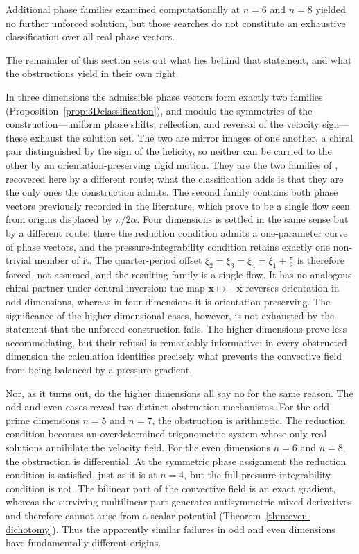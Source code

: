 \documentclass[11pt]{jfm}
\numberwithin{equation}{section}
\begin{document}
\noindent Additional phase families examined computationally at $n=6$ and $n=8$ yielded no further
unforced solution, but those searches do not constitute an exhaustive classification over all real
phase vectors.

\noindent The remainder of this section sets out what lies behind that statement, and what the
obstructions yield in their own right.

In three dimensions the admissible phase vectors form exactly
two families (Proposition~\ref{prop:3Dclassification}), and modulo the symmetries of the
construction---uniform phase shifts, reflection, and reversal of the velocity sign---these exhaust
the solution set. The two are mirror images of one another, a chiral pair distinguished by the sign
of the helicity, so neither can be carried to the other by an orientation-preserving rigid motion. They are the two
families of \citet{ant}, recovered here by a different route; what the classification adds is that
they are the only ones the construction admits. The second family contains both phase vectors
previously recorded in the literature, which prove to be a single flow seen from origins displaced
by $\pi/2\alpha$. Four dimensions is settled in the same sense but by
a different route: there the reduction condition admits a one-parameter curve of phase vectors,
and the pressure-integrability condition retains exactly one non-trivial member of it. The
quarter-period offset $\xi_2=\xi_3=\xi_4=\xi_1+\tfrac{\pi}{2}$ is therefore forced, not assumed,
and the resulting family is a single flow. It has no analogous chiral partner under central inversion: the map
$\boldsymbol{x}\mapsto-\boldsymbol{x}$ reverses
orientation in odd dimensions, whereas in four dimensions it is orientation-preserving. The significance of the
higher-dimensional cases, however, is not exhausted by the statement that the unforced
construction fails. The higher dimensions prove less accommodating, but their refusal is
remarkably informative: in every obstructed dimension the calculation identifies precisely
what prevents the convective field from being balanced by a pressure gradient.

Nor, as it turns out, do the higher dimensions all say no for the same reason. The odd and
even cases reveal two distinct obstruction mechanisms. For the odd prime dimensions $n=5$
and $n=7$, the obstruction is arithmetic. The reduction condition becomes an overdetermined
trigonometric system whose only real solutions annihilate the velocity field. For the even dimensions $n=6$ and $n=8$, the obstruction is
differential. At the symmetric phase assignment the reduction condition is satisfied, just
as it is at $n=4$, but the full pressure-integrability condition is not. The bilinear part of
the convective field is an exact gradient, whereas the surviving multilinear part generates
antisymmetric mixed derivatives and therefore cannot arise from a scalar potential
(Theorem~\ref{thm:even-dichotomy}). Thus the apparently similar failures in odd and even
dimensions have fundamentally different origins.
\end{document}
